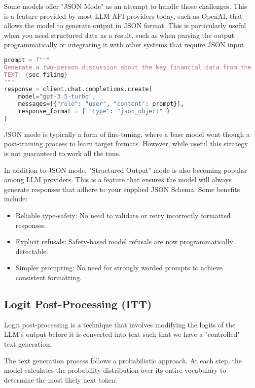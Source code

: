 \documentclass{article}
\begin{document}
Some models offer "JSON Mode" as an attempt to handle those challenges. This is a feature provided by most LLM API providers today, such as OpenAI, that allows the model to generate output in JSON format. This is particularly useful when you need structured data as a result, such as when parsing the output programmatically or integrating it with other systems that require JSON input.

\begin{lstlisting}[language=Python, caption=Using JSON mode with OpenAI API]
prompt = f"""
Generate a two-person discussion about the key financial data from the following text in JSON format.
TEXT: {sec_filing}
"""
response = client.chat.completions.create(
    model="gpt-3.5-turbo",
    messages=[{"role": "user", "content": prompt}],
    response_format = { "type": "json_object" }
)
\end{lstlisting}

JSON mode is typically a form of fine-tuning, where a base model went though a post-training process to learn target formats. However, while useful this strategy is not guaranteed to work all the time.

In addition to JSON mode, "Structured Output" mode is also becoming popular among LLM providers. This is a feature that ensures the model will always generate responses that adhere to your supplied JSON Schema. Some benefits include:

\begin{itemize}
    \item Reliable type-safety: No need to validate or retry incorrectly formatted responses.
    \item Explicit refusals: Safety-based model refusals are now programmatically detectable.
    \item Simpler prompting: No need for strongly worded prompts to achieve consistent formatting.
\end{itemize}

\subsection{Logit Post-Processing (ITT)}

Logit post-processing is a technique that involves modifying the logits of the LLM's output before it is converted into text such that we have a "controlled" text generation.

The text generation process follows a probabilistic approach. At each step, the model calculates the probability distribution over its entire vocabulary to determine the most likely next token.
\end{document}
